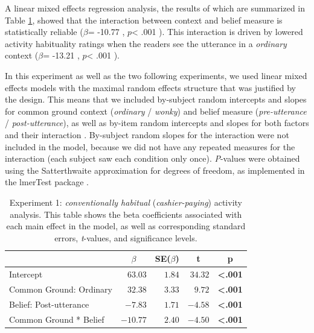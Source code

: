 \documentclass{sp}\usepackage[]{graphicx}\usepackage[]{color}
\begin{document}
A linear mixed effects regression analysis, the results of which are summarized in Table \ref{tab:exp1habitual}, showed that the interaction between context and belief measure is statistically reliable ($\beta$=%
-10.77
, $p$<%
.001
). This interaction is driven by lowered activity habituality ratings when the readers see the utterance in a \textit{ordinary} context ($\beta$=%
-13.21
, $p$<%
.001
).

In this experiment as well as the two following experiments, we used linear mixed effects models with the maximal random effects structure that was justified by the design. This means that we included by-subject random intercepts and slopes for common ground context (\textit{ordinary} / \textit{wonky}) and belief measure (\textit{pre-utterance} / \textit{post-utterance}), as well as by-item random intercepts and slopes for both factors and their interaction \citep{Barr2013}. By-subject random slopes for the interaction were not included in the model, because we did not have any repeated measures for the interaction (each subject saw each condition only once). \textit{P}-values were obtained using the Satterthwaite approximation for degrees of freedom, as implemented in the lmerTest package \citep{Kuznetsova2017}.

\begin{table}[ht]
\caption{Experiment 1: \textit{conventionally habitual} (\textit{cashier-paying}) activity analysis. This table shows the beta coefficients associated with each main effect in the model, as well as corresponding standard errors, \emph{t}-values, and significance levels.\label{tab:exp1habitual}} 
\begin{center}
\begin{tabular}{lrrrl}
\toprule
\multicolumn{1}{l}{}&\multicolumn{1}{c}{$\beta$}&\multicolumn{1}{c}{SE($\beta$)}&\multicolumn{1}{c}{\textbf{t}}&\multicolumn{1}{c}{\textbf{p}}\tabularnewline
\midrule
Intercept&$ 63.03$&$1.84$&$34.32$&\textbf{\textless .001}\tabularnewline
Common Ground: Ordinary&$ 32.38$&$3.33$&$ 9.72$&\textbf{\textless .001}\tabularnewline
Belief: Post-utterance&$ -7.83$&$1.71$&$-4.58$&\textbf{\textless .001}\tabularnewline
Common Ground * Belief&$-10.77$&$2.40$&$-4.50$&\textbf{\textless .001}\tabularnewline
\bottomrule
\end{tabular}\end{center}
\end{table}
\end{document}
